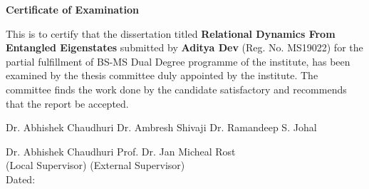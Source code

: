 \begin{center}
    \textbf{\Large Certificate of Examination}
\end{center}

This is to certify that the dissertation titled \textbf{Relational Dynamics From Entangled Eigenstates} submitted by 
\textbf{Aditya Dev} (Reg. No. MS19022) for the partial fulfillment of BS-MS Dual Degree 
programme of the institute, has been examined by the thesis committee duly appointed by the 
institute. The committee finds the work done by the candidate satisfactory and recommends 
that the report be accepted.

\vspace{4cm}

Dr. Abhishek Chaudhuri \hspace{0.9cm} Dr. Ambresh Shivaji \hspace{0.9cm} Dr. Ramandeep S. Johal

\vspace{4cm}
\begin{flushleft}
    Dr. Abhishek Chaudhuri \hfill Prof. Dr. Jan Micheal Rost 
    \\
    (Local Supervisor) \hfill (External Supervisor)
    \\
    \vspace{4cm}
    Dated: 
\end{flushleft}
